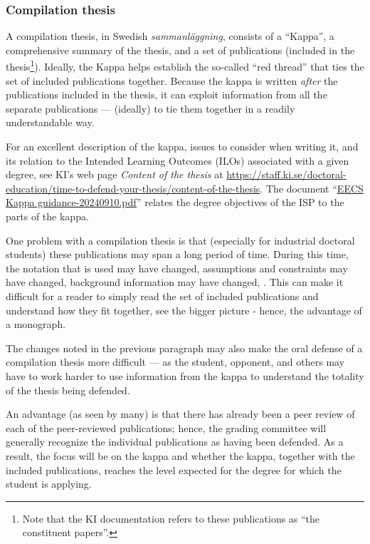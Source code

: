 \documentclass[12pt, twoside]{article}
\begin{document}
\FloatBarrier

\subsubsection{Compilation thesis}
\label{sec:cycle3CompilationThesis}

A compilation thesis, in Swedish \textit{\foreignlanguage{swedish}{sammanläggning}}, consists of a \enquote{Kappa}, \ie a comprehensive summary of the thesis, and a set of publications (included in the thesis\footnote{Note that the \gls{KI} documentation refers to these publications as \enquote{the constituent papers}.}). Ideally, the Kappa helps establish the so-called \enquote{red thread} that ties the set of included publications together. Because the kappa is written \textit{after} the publications included in the thesis, it can exploit information from all the separate publications --- (ideally) to tie them together in a readily understandable way.

For an excellent description of the kappa, issues to consider when writing it, and its relation to the Intended Learning Outcomes (ILOs) associated with a given degree, see \gls{KI}'s web page \textit{Content of the thesis} at \url{https://staff.ki.se/doctoral-education/time-to-defend-your-thesis/content-of-the-thesis}. The document  ``\href{https://intra.kth.se/polopoly_fs/1.1355932.1726050722!/EECS%20Kappa%20Guidance%2020240910.pdf}{EECS Kappa guidance-20240910.pdf}'' relates the degree objectives of the \gls{ISP} to the parts of the kappa.

One problem with a compilation thesis is that (especially for industrial doctoral students) these publications may span a long period of time. During this time, the notation that is used may have changed, assumptions and constraints may have changed, background information may have changed, \etc. This can make it difficult for a reader to simply read the set of included publications and understand how they fit together, \ie see the bigger picture - hence, the advantage of a monograph.

The changes noted in the previous paragraph may also make the oral defense of a compilation thesis more difficult --- as the student, opponent, and others may have to work harder to use information from the kappa to understand the totality of the thesis being defended.

An advantage (as seen by many) is that there has already been a peer review of each of the peer-reviewed publications; hence, the grading committee will generally recognize the individual publications as having been defended. As a result, the focus will be on the kappa and whether the kappa, together with the included publications, reaches the level expected for the degree for which the student is applying.
\medskip
\end{document}
